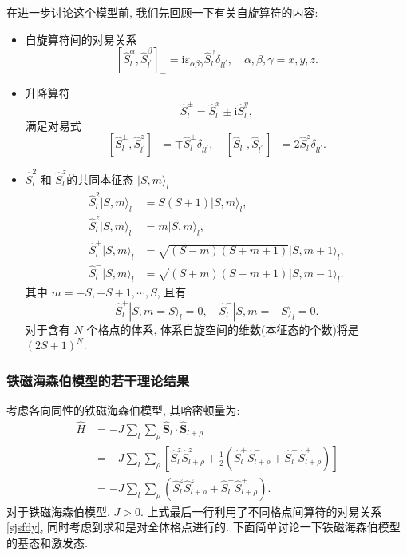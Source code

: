 在进一步讨论这个模型前, 我们先回顾一下有关自旋算符的内容:
\begin{itemize}
\item 自旋算符间的对易关系
\begin{equation}
\left[\hat{S}_{l}^{\alpha}, \hat{S}_{l^{\prime}}^{\beta}\right]_{-}=\mathrm{i} \varepsilon_{\alpha \beta \gamma} \hat{S}_{l}^{\gamma} \delta_{l l^{\prime}}, \quad \alpha, \beta, \gamma=x, y, z.
\end{equation}

\item 升降算符
\begin{equation}
\hat{S}_{l}^{\pm}=\hat{S}_{l}^{x} \pm \mathrm{i} \hat{S}_{l}^{y},
\end{equation}
满足对易式
\begin{equation}\label{sjsfdy}
\left[\hat{S}_{l}^{\pm}, \hat{S}_{l^{\prime}}^{z}\right]_{-}=\mp \hat{S}_{l}^{\pm} \delta_{l l^{\prime}}, \quad\left[\hat{S}_{l}^{+}, \hat{S}_{l^{\prime}}^{-}\right]_{-}=2 \hat{S}_{l}^{z} \delta_{l l^{\prime}}.
\end{equation}

\item $\hat{S}_{l}^{2}$ 和 $\hat{S}_{l}^{z}$的共同本征态 $|S, m\rangle_{l}$
\begin{align}
\hat{S}_{l}^{2}|S, m\rangle_{l}&=S(S+1)|S, m\rangle_{l} , \nonumber\\
\hat{S}_{l}^{z}|S, m\rangle_{l}&=m|S, m\rangle_{l} , \nonumber\\
\hat{S}_{l}^{+}|S, m\rangle_{l}&=\sqrt{(S-m)(S+m+1)}|S, m+1\rangle_{l} ,\nonumber \\
\hat{S}_{l}^{-}|S, m\rangle_{l}&=\sqrt{(S+m)(S-m+1)}|S, m-1\rangle_{l} .
\end{align}
其中 $m=-S,-S+1,\cdots,S$, 且有
\begin{equation}
\hat{S}_{l}^{+}|S, m=S\rangle_{l}=0, \quad \hat{S}_{l}^{-}|S,m=-S\rangle_{l}=0.
\end{equation}
对于含有 $N$ 个格点的体系, 体系自旋空间的维数(本征态的个数)将是 $(2 S+1)^{N}$.
\end{itemize}

\subsubsection{铁磁海森伯模型的若干理论结果}
考虑各向同性的铁磁海森伯模型, 其哈密顿量为:
\begin{align}
\hat{H} &=-J \sum_{l} \sum_{\rho} \hat{\boldsymbol{S}}_l \cdot \hat{\boldsymbol{S}}_{l+\rho}\nonumber \\
&=-J \sum_{l} \sum_{\rho}\left[\hat{S}_{l}^{z} \hat{S}_{l+\rho}^{z}+\frac{1}{2}\left(\hat{S}_{l}^{+} \hat{S}_{l+\rho}^{-}+\hat{S}_{l}^{-} \hat{S}_{l+\rho}^{+}\right)\right] \nonumber\\
&=-J \sum_{l} \sum_{\rho}\left(\hat{S}_{l}^{z} \hat{S}_{l+\rho}^{z}+\hat{S}_{l}^{-} \hat{S}_{l+\rho}^{+}\right) .
\end{align}
对于铁磁海森伯模型, $J>0$. 上式最后一行利用了不同格点间算符的对易关系\eqref{sjsfdy}, 同时考虑到求和是对全体格点进行的. 下面简单讨论一下铁磁海森伯模型的基态和激发态.

